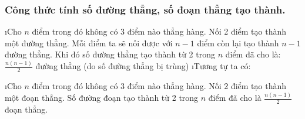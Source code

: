\subsubsection{Công thức tính số đường thẳng, số đoạn thẳng tạo thành.}
\begin{enumerate}[--,leftmargin=*]
\i Cho $n$ điểm trong đó không có 3 điểm nào thẳng hàng. Nối 2 điểm tạo thành một đường thẳng. Mỗi điểm ta sẽ nối được với $n-1$ điểm còn lại tạo thành $n-1$ đường thẳng.
Khi đó số đường thẳng tạo thành từ 2 trong $n$ điểm đã cho là: $\frac{n(n-1)}{2}$  đường thẳng  (do số đường thẳng bị trùng)	
\i Tương tự ta có: 
\begin{enumerate}[+,leftmargin=*]
	\i Cho $n$ điểm trong đó không có 3 điểm nào thẳng hàng. Nối 2 điểm tạo thành một đoạn thẳng. Số đường đoạn tạo thành từ 2 trong $n$ điểm đã cho là $\frac{n(n-1)}{2}$ đoạn thẳng.
\end{enumerate}
\end{enumerate}
%		
%			
